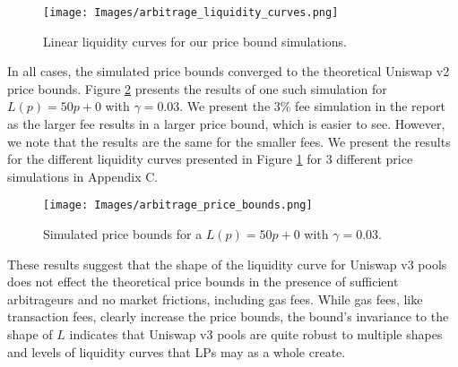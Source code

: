 \documentclass[11pt]{article}
\begin{document}
\begin{figure}[H]
    \centering
    \texttt{[image: Images/arbitrage\_liquidity\_curves.png]}
    \caption{Linear liquidity curves for our price bound simulations.}
    \label{fig:linear_liquidity_curves}
\end{figure}

In all cases, the simulated price bounds converged to the theoretical Uniswap v2 price bounds. Figure \ref{fig:price_bound_simulation} presents the results of one such simulation for $L(p) = 50p + 0$ with $\gamma = 0.03$. We present the 3\% fee simulation in the report as the larger fee results in a larger price bound, which is easier to see. However, we note that the results are the same for the smaller fees. We present the results for the different liquidity curves presented in Figure \ref{fig:linear_liquidity_curves} for 3 different price simulations in Appendix C.

\begin{figure}[H]
    \centering
    \texttt{[image: Images/arbitrage\_price\_bounds.png]}
    \caption{Simulated price bounds for a $L(p) = 50p + 0$ with $\gamma = 0.03$.}
    \label{fig:price_bound_simulation}
\end{figure}

These results suggest that the shape of the liquidity curve for Uniswap v3 pools does not effect the theoretical price bounds in the presence of sufficient arbitrageurs and no market frictions, including gas fees. While gas fees, like transaction fees, clearly increase the price bounds, the bound's invariance to the shape of $L$ indicates that Uniswap v3 pools are quite robust to multiple shapes and levels of liquidity curves that LPs may as a whole create.
\end{document}

